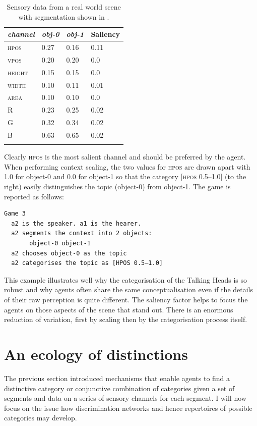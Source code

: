 \begin{table}
\begin{center}
\begin{tabular}{ l  l  l  l }
\lsptoprule
{\itshape channel}& {\itshape obj-0} & {\itshape obj-1} & Saliency\\ \midrule
\textsc{hpos} & 0.27 & 0.16 & 0.11\\ 
\textsc{vpos} & 0.20 & 0.20 & 0.0\\ 
\textsc{height} & 0.15 & 0.15 & 0.0\\ 
\textsc{width} & 0.10 & 0.11 & 0.01\\ 
\textsc{area} & 0.10 & 0.10 & 0.0\\ 
R & 0.23 & 0.25 & 0.02\\ 
G & 0.32 & 0.34  & 0.02\\ 
B & 0.63 & 0.65 & 0.02\\ 
\lspbottomrule
\end{tabular}
\caption{\label{tab:t-real}Sensory data from a real world scene with segmentation shown in .}
\end{center}
\end{table}
Clearly \textsc{hpos} is the most salient channel and should be 
preferred by the agent. When performing context scaling, 
the two values for \textsc{hpos} are drawn apart with 1.0 for object-0 and 
0.0 for object-1 so that the category [\textsc{hpos} 0.5–1.0] (to the 
right) easily distinguishes the topic (object-0) from
object-1. The game is reported as follows: 
\begin{verbatim}
Game 3 
  a2 is the speaker. a1 is the hearer. 
  a2 segments the context into 2 objects: 
       object-0 object-1
  a2 chooses object-0 as the topic 
  a2 categorises the topic as [HPOS 0.5–1.0]
\end{verbatim}
This example illustrates well why the categorisation 
of the Talking Heads is so robust and why agents 
often share the same conceptualisation even if the details  
of their raw perception is quite different. 
The saliency factor helps to focus the agents on those
aspects of the scene that stand out. There is 
an enormous reduction of variation, first by scaling then by 
the categorisation process itself. 

\section{An ecology of distinctions}

The previous section introduced mechanisms that 
enable agents to find a distinctive category or
conjunctive combination of categories given 
a set of segments and data on a series of sensory 
channels for each segment. I will now focus on the 
issue how discrimination networks and hence
repertoires of possible categories may develop. 

